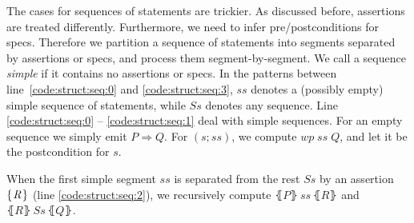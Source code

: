 \documentclass[runningheads]{llncs}
\newcommand{\Conid}[1]{\mathit{#1}}
\newcommand{\Varid}[1]{\mathit{#1}}
\let\Varid\mathit
\let\Conid\mathit
\newcommand{\todo}[1]{{\bf Todo}: \lbrack #1 \rbrack}
\begin{document}
The cases for sequences of statements are trickier.
As discussed before, assertions are treated differently.
Furthermore, we need to infer pre/postconditions for specs.
Therefore we partition a sequence of statements into segments separated by assertions or specs, and process them segment-by-segment.
We call a sequence \emph{simple} if it contains no assertions or specs.
In the patterns between line~\ref{code:struct:seq:0} and \ref{code:struct:seq:3}, \ensuremath{\Varid{ss}} denotes a (possibly empty) simple sequence of statements, while \ensuremath{\Conid{Ss}} denotes any sequence.
Line \ref{code:struct:seq:0} -- \ref{code:struct:seq:1} deal with simple sequences.
For an empty sequence we simply emit \ensuremath{\Conid{P}\mathrel{\Rightarrow}\Conid{Q}}.
For \ensuremath{(\Varid{s};\Varid{ss})}, we compute \ensuremath{\Varid{wp}\;\Varid{ss}\;\Conid{Q}}, and let it be the postcondition for \ensuremath{\Varid{s}}.

When the first simple segment \ensuremath{\Varid{ss}} is separated from the rest \ensuremath{\Conid{Ss}} by an assertion \ensuremath{\{\mskip1.5mu \Conid{R}\mskip1.5mu\}} (line \ref{code:struct:seq:2}), we recursively compute \ensuremath{\lBrace\Conid{P}\rBrace\,\Varid{ss}\,\lBrace\Conid{R}\rBrace} and \ensuremath{\lBrace\Conid{R}\rBrace\,\Conid{Ss}\,\lBrace\Conid{Q}\rBrace}.
\end{document}
